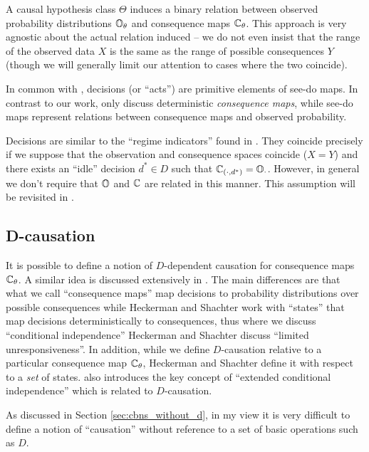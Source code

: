 A causal hypothesis class $\Theta$ induces a binary relation between observed probability distributions $\mathbb{O}_\theta$ and consequence maps $\mathbb{C}_\theta$. This approach is very agnostic about the actual relation induced -- we do not even insist that the range of the observed data $X$ is the same as the range of possible consequences $Y$ (though we will generally limit our attention to cases where the two coincide). 

In common with \citet{heckerman_decision-theoretic_1995}, decisions (or ``acts'') are primitive elements of see-do maps. In contrast to our work, \citet{heckerman_decision-theoretic_1995} only discuss deterministic \emph{consequence maps}, while see-do maps represent relations between consequence maps and observed probability.

Decisions are similar to the ``regime indicators'' found in \citet{dawid_decision-theoretic_2020}. They coincide precisely if we suppose that the observation and consequence spaces coincide ($X=Y$) and there exists an ``idle'' decision $d^*\in D$ such that $\mathbb{C}_{(\cdot,d^*)} = \mathbb{O}_{\cdot}$. However, in general we don't require that $\mathbb{O}$ and $\mathbb{C}$ are related in this manner. This assumption will be revisited in .

\subsection{D-causation}


It is possible to define a notion of $D$-dependent causation for consequence maps $\mathbb{C}_\theta$. A similar idea is discussed extensively in \citet{heckerman_decision-theoretic_1995}. The main differences are that what we call ``consequence maps'' map decisions to probability distributions over possible consequences while Heckerman and Shachter work with ``states'' that map decisions deterministically to consequences, thus where we discuss ``conditional independence'' Heckerman and Shachter discuss ``limited unresponsiveness''. In addition, while we define $D$-causation relative to a particular consequence map $\mathbb{C}_\theta$, Heckerman and Shachter define it with respect to a \emph{set} of states. \citet{dawid_decision-theoretic_2020} also introduces the key concept of ``extended conditional independence'' which is related to $D$-causation. 

As discussed in Section \ref{sec:cbns_without_d}, in my view it is very difficult to define a notion of ``causation'' without reference to a set of basic operations such as $D$.

